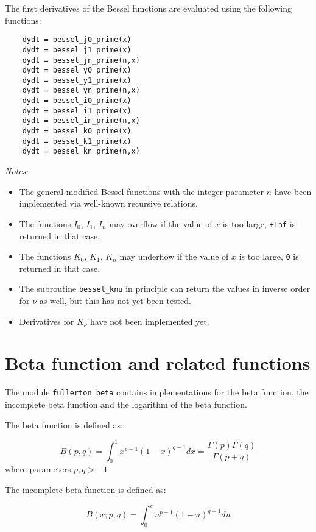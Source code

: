 \documentclass{article}
\begin{document}
The first derivatives of the Bessel functions are evaluated using the following functions:

\begin{verbatim}
    dydt = bessel_j0_prime(x)
    dydt = bessel_j1_prime(x)
    dydt = bessel_jn_prime(n,x)
    dydt = bessel_y0_prime(x)
    dydt = bessel_y1_prime(x)
    dydt = bessel_yn_prime(n,x)
    dydt = bessel_i0_prime(x)
    dydt = bessel_i1_prime(x)
    dydt = bessel_in_prime(n,x)
    dydt = bessel_k0_prime(x)
    dydt = bessel_k1_prime(x)
    dydt = bessel_kn_prime(n,x)
\end{verbatim}

\emph{Notes:}
\begin{itemize}
\item
The general modified Bessel functions with the integer parameter $n$ have been implemented via
well-known recursive relations.
\item
The functions $I_0$, $I_1$, $I_n$ may overflow if the value of $x$ is too large, \verb~+Inf~ is returned in that case.
\item
The functions $K_0$, $K_1$, $K_n$ may underflow if the value of $x$ is too large, \verb~0~ is returned in that case.
\item
The subroutine \verb+bessel_knu+ in principle can return the values in inverse order for $\nu$ as well, but this
has not yet been tested.
\item
Derivatives for $K_\nu$ have not been implemented yet.
\end{itemize}


\section{Beta function and related functions}
The module \verb+fullerton_beta+ contains implementations for the beta function, the incomplete beta function
and the logarithm of the beta function.

The beta function is defined as:

\begin{equation}
    B(p,q) = \int_0^1 x^{p-1} (1 - x)^{q-1} dx = \frac{\Gamma(p)\Gamma(q)}{\Gamma(p+q)}
\end{equation}
\noindent where parameters $p, q > -1$

The incomplete beta function is defined as:

\begin{equation}
    B(x;p,q) = \int_0^x u^{p-1} (1 - u)^{q-1} du
\end{equation}
\end{document}

